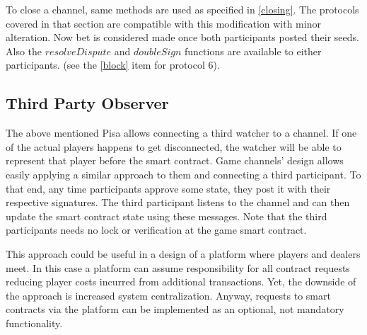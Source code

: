To close a channel, same methods are used as specified in \autoref{closing}. The protocols covered in that section are compatible with this modification with minor alteration. Now bet is considered made once both participants posted their seeds. Also the  $resolveDispute$ and $doubleSign$ functions are available to either participants. (see the \ref{block} item for protocol 6). 

\subsection{Third Party Observer}

The above mentioned Pisa \cite{bib9} allows connecting a third watcher to a channel. If one of the actual players happens to get disconnected, the watcher will be able to represent that player before the smart contract. Game channels’ design allows easily applying a similar approach to them and connecting a third participant. To that end, any time participants approve some state, they post it with their respective signatures. The third participant listens to the channel and can then update the smart contract state using these messages. Note that the third participants needs no lock or verification at the game smart contract. 

This approach could be useful in a design of a platform where players and dealers meet. In this case a platform can assume responsibility for all contract requests reducing player costs incurred from additional transactions. Yet, the downside of the approach is increased system centralization. Anyway, requests to smart contracts via the platform can be implemented as an optional, not mandatory functionality.


